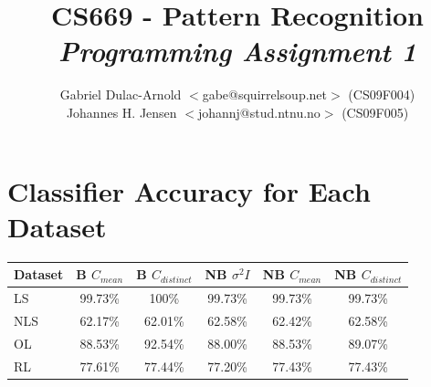 \documentclass[a4paper]{article}
\author{Gabriel Dulac-Arnold $<$gabe@squirrelsoup.net$>$ (CS09F004) \\
Johannes H. Jensen $<$johannj@stud.ntnu.no$>$ (CS09F005)}
\title{CS669 - Pattern Recognition\\
\emph{Programming Assignment 1}}
\begin{document}
\setlength{\parskip}{2ex}
\maketitle

\section{Classifier Accuracy for Each Dataset}

\begin{tabular}{ l | c | c | c | c | c | }
Dataset & B $C_{mean}$ & B $C_{distinct}$ & NB $\sigma^2 I$ & NB $C_{mean}$ & NB $C_{distinct}$\\
\hline
  LS & 99.73\% & 100\% & 99.73\% & 99.73\% & 99.73\% \\ 
\hline
  NLS & 62.17\% & 62.01\% & 62.58\% & 62.42\% & 62.58\% \\
\hline
  OL & 88.53\% & 92.54\% & 88.00\% & 88.53\% & 89.07\% \\
\hline
  RL & 77.61\% & 77.44\% & 77.20\% & 77.43\% & 77.43\% \\
\hline
\end{tabular}
\end{document}

